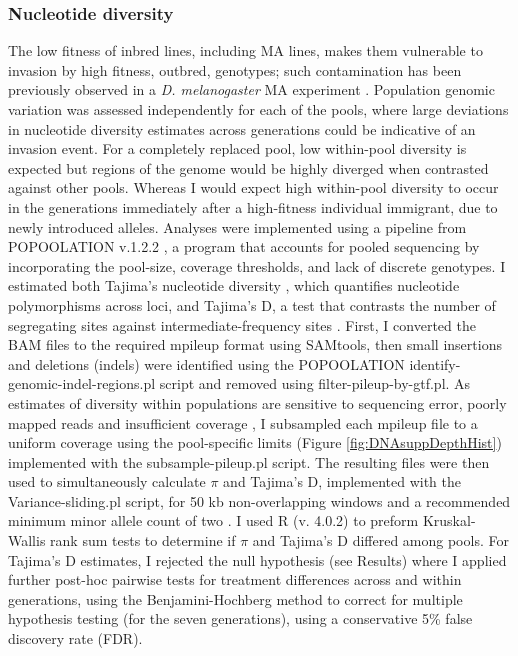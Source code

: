 \subsubsection{Nucleotide diversity}
The low fitness of inbred lines, including MA lines, makes them vulnerable to invasion by high fitness, outbred, genotypes; such contamination has been previously observed in a \textit{D. melanogaster} MA experiment \citep[as described in ][]{Houl94}. Population genomic variation was assessed independently for each of the pools, where large deviations in nucleotide diversity estimates across generations could be indicative of an invasion event. For a completely replaced pool, low within-pool diversity is expected but regions of the genome would be highly diverged when contrasted against other pools. Whereas I would expect high within-pool diversity to occur in the generations immediately after a high-fitness individual immigrant, due to newly introduced alleles. Analyses were implemented using a pipeline from POPOOLATION v.1.2.2 \citep{Kofl11}, a program that accounts for pooled sequencing by incorporating the pool-size, coverage thresholds, and lack of discrete genotypes. I estimated both Tajima’s nucleotide diversity \citep[$\pi$,][]{Taji83}, which quantifies nucleotide polymorphisms across loci, and Tajima’s D, a test that contrasts the number of segregating sites against intermediate-frequency sites \citep[for a population at mutation-drift equilibrium, these two estimates should be approximate,][]{Taji89}. First, I converted the BAM files to the required mpileup format using SAMtools, then small insertions and deletions (indels) were identified using the POPOOLATION identify-genomic-indel-regions.pl script and removed using filter-pileup-by-gtf.pl. As estimates of diversity within populations are sensitive to sequencing error, poorly mapped reads and insufficient coverage \citep{Kofl11}, I subsampled each mpileup file to a uniform coverage using the pool-specific limits (Figure \ref{fig:DNAsuppDepthHist}) implemented with the subsample-pileup.pl script. The resulting files were then used to simultaneously calculate $\pi$ and Tajima’s D, implemented with the Variance-sliding.pl script, for 50 kb non-overlapping windows and a recommended minimum minor allele count of two \citep{Kofl11}. I used R (v. 4.0.2) to preform Kruskal-Wallis rank sum tests to determine if $\pi$ and Tajima’s D differed among pools. For Tajima’s D estimates, I rejected the null hypothesis (see Results) where I applied further post-hoc pairwise tests for treatment differences across and within generations, using the Benjamini-Hochberg method \citep{Benj95} to correct for multiple hypothesis testing (for the seven generations), using a conservative 5\% false discovery rate (FDR). \par

